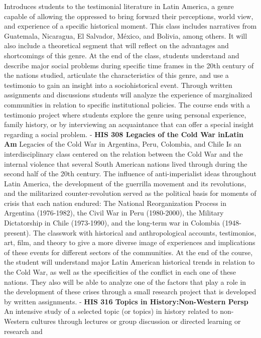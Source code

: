 \documentclass[
  letterpaper,
]{scrbook}
\begin{document}
Introduces students to the testimonial literature in Latin America, a
genre capable of allowing the oppressed to bring forward their
perceptions, world view, and experience of a specific historical moment.
This class includes narratives from Guatemala, Nicaragua, El Salvador,
México, and Bolivia, among others. It will also include a theoretical
segment that will reflect on the advantages and shortcomings of this
genre. At the end of the class, students understand and describe major
social problems during specific time frames in the 20th century of the
nations studied, articulate the characteristics of this genre, and use a
testimonio to gain an insight into a sociohistorical event. Through
written assignments and discussions students will analyze the experience
of marginalized communities in relation to specific institutional
policies. The course ends with a testimonio project where students
explore the genre using personal experience, family history, or by
interviewing an acquaintance that can offer a special insight regarding
a social problem. - \textbf{HIS 308 Legacies of the Cold War inLatin Am}
Legacies of the Cold War in Argentina, Peru, Colombia, and Chile Is an
interdisciplinary class centered on the relation between the Cold War
and the internal violence that several South American nations lived
through during the second half of the 20th century. The influence of
anti-imperialist ideas throughout Latin America, the development of the
guerrilla movement and its revolutions, and the militarized
counter-revolution served as the political basis for moments of crisis
that each nation endured: The National Reorganization Process in
Argentina (1976-1982), the Civil War in Peru (1980-2000), the Military
Dictatorship in Chile (1973-1990), and the long-term war in Colombia
(1948-present). The classwork with historical and anthropological
accounts, testimonios, art, film, and theory to give a more diverse
image of experiences and implications of these events for different
sectors of the communities. At the end of the course, the student will
understand major Latin American historical trends in relation to the
Cold War, as well as the specificities of the conflict in each one of
these nations. They also will be able to analyze one of the factors that
play a role in the development of these crises through a small research
project that is developed by written assignments. - \textbf{HIS 316
Topics in History:Non-Western Persp} An intensive study of a selected
topic (or topics) in history related to non-Western cultures through
lectures or group discussion or directed learning or research and
\end{document}
